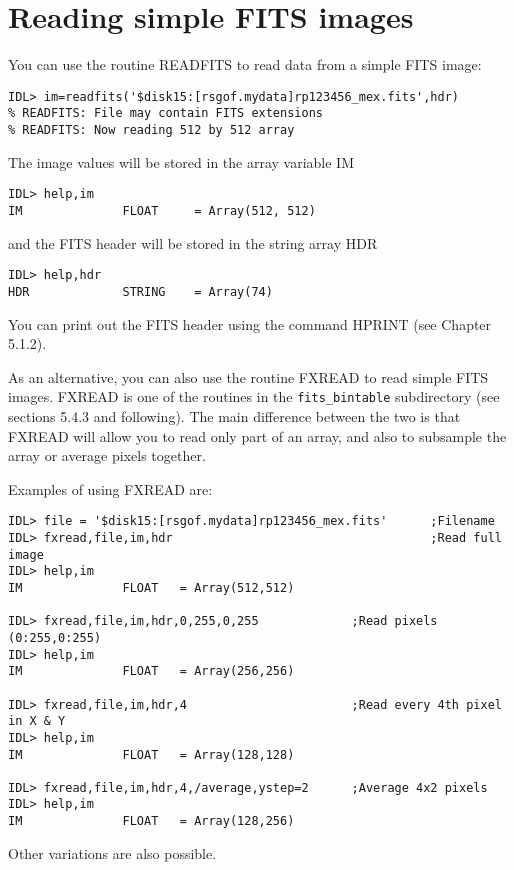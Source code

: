 \section{Reading simple FITS images}
 
You can use the routine READFITS to read data from a simple FITS image:

\medskip\noindent
\begin{verbatim}
IDL> im=readfits('$disk15:[rsgof.mydata]rp123456_mex.fits',hdr)
% READFITS: File may contain FITS extensions
% READFITS: Now reading 512 by 512 array
\end{verbatim}
The image values will be stored in the array variable IM

\medskip\noindent
\begin{verbatim}
IDL> help,im
IM              FLOAT     = Array(512, 512)
\end{verbatim}
and the FITS header will be stored in the string array HDR

\medskip\noindent
\begin{verbatim}
IDL> help,hdr
HDR             STRING    = Array(74)
\end{verbatim}
You can print out the FITS header using the command HPRINT (see Chapter 5.1.2).
 
As an alternative, you can also use the routine FXREAD to read simple FITS
images. FXREAD is one of the routines in the {\tt fits{\_}bintable} subdirectory
(see sections 5.4.3 and following). The main difference between the two is
that FXREAD will allow you to read only part of an array, and also to
subsample the array or average pixels together.
 
Examples of using FXREAD are:

\medskip\noindent
\begin{verbatim}
IDL> file = '$disk15:[rsgof.mydata]rp123456_mex.fits'      ;Filename
IDL> fxread,file,im,hdr                                    ;Read full image
IDL> help,im
IM              FLOAT   = Array(512,512)
 
IDL> fxread,file,im,hdr,0,255,0,255             ;Read pixels (0:255,0:255)
IDL> help,im
IM              FLOAT   = Array(256,256)
 
IDL> fxread,file,im,hdr,4                       ;Read every 4th pixel in X & Y
IDL> help,im
IM              FLOAT   = Array(128,128)
 
IDL> fxread,file,im,hdr,4,/average,ystep=2      ;Average 4x2 pixels
IDL> help,im
IM              FLOAT   = Array(128,256)
\end{verbatim}
Other variations are also possible.
 

